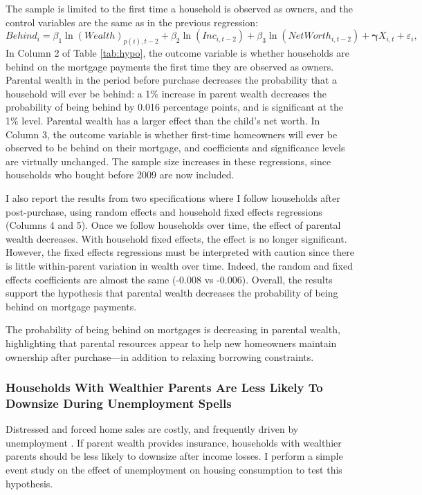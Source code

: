 \documentclass[12pt]{article}
\begin{document}
The sample is limited to the first time a household is observed as owners, and the control variables are the same as in the previous regression:
\begin{equation*}
Behind_i = \beta_1 \ln(Wealth)_{p(i),t-2} + \beta_2 \ln(Inc_{i,t-2}) + \beta_3 \ln(NetWorth_{i,t-2}) + \mathbf{\gamma}{X_{i,t}} + \varepsilon_{i},
\end{equation*}
In Column 2 of Table \ref{tab:hypo}, the outcome variable is whether households are behind on the mortgage payments the first time they are observed as owners. Parental wealth in the period before purchase decreases the probability that a household will ever be behind: a 1\% increase in parent wealth decreases the probability of being behind by 0.016 percentage points, and is significant at the 1\% level. Parental wealth has a larger effect than the child's net worth. In Column 3, the outcome variable is whether first-time homeowners will ever be observed to be behind on their mortgage, and coefficients and significance levels are virtually unchanged. The sample size increases in these regressions, since households who bought before 2009 are now included.

I also report the results from two specifications where I follow households after post-purchase, using random effects and household fixed effects regressions (Columns 4 and 5). Once we follow households over time, the effect of parental wealth decreases. With household fixed effects, the effect is no longer significant. However, the fixed effects regressions must be interpreted with caution since there is little within-parent variation in wealth over time. Indeed, the random and fixed effects coefficients are almost the same (-0.008 vs -0.006). Overall, the results support the hypothesis that parental wealth decreases the probability of being behind on mortgage payments.

The probability of being behind on mortgages is decreasing in parental wealth, highlighting that parental resources appear to help new homeowners maintain ownership after purchase---in addition to relaxing borrowing constraints.

\subsubsection{Households With Wealthier Parents Are Less Likely To Downsize During Unemployment Spells}\label{sec:eventstudy}
Distressed and forced home sales are costly, and frequently driven by unemployment \citep{kermani2021racial,hsu2018unemployment}. If parent wealth provides insurance, households with wealthier parents should be less likely to downsize after income losses. I perform a simple event study on the effect of unemployment on housing consumption to test this hypothesis.
\end{document}
